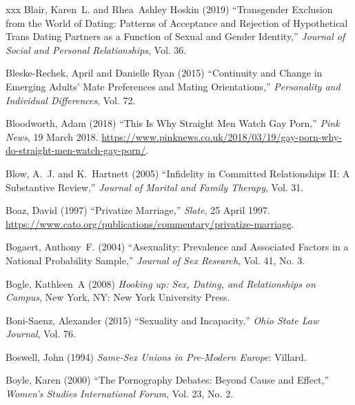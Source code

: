 \documentclass[]{jlreq} \usepackage{mystyle}
\begin{document}
\begin{thebibliography}{xxx}
Blair, Karen~L. and Rhea~Ashley Hoskin (2019) ``Transgender Exclusion from the
  World of Dating: Patterns of Acceptance and Rejection of Hypothetical Trans
  Dating Partners as a Function of Sexual and Gender Identity,'' \textit{
  Journal of Social and Personal Relationships}, Vol. 36.

Bleske-Rechek, April and Danielle Ryan (2015) ``Continuity and Change in
  Emerging Adults' Mate Preferences and Mating Orientations,'' \textit{
  Personality and Individual Differences}, Vol. 72.

Bloodworth, Adam (2018) ``This Is Why Straight Men Watch Gay Porn,'' \emph{Pink
  News}, 19 March 2018.
  \url{https://www.pinknews.co.uk/2018/03/19/gay-porn-why-do-straight-men-watch-gay-porn/}.

Blow, A.~J. and K.~Hartnett (2005) ``Infidelity in Committed Relationships II:
  A Substantive Review,'' \textit{ Journal of Marital and Family Therapy}, Vol.
  31.

Boaz, David (1997) ``Privatize Marriage,'' \emph{Slate}, 25 April 1997.
  \url{https://www.cato.org/publications/commentary/privatize-marriage}.

Bogaert, Anthony~F. (2004) ``Asexuality: Prevalence and Associated Factors in a
  National Probability Sample,'' \textit{ Journal of Sex Research}, Vol. 41,
  No. 3.

Bogle, Kathleen~A (2008)  \textit{ Hooking up: Sex, Dating, and Relationships
  on Campus}, New York, NY: New York University Press.

Boni-Saenz, Alexander (2015) ``Sexuality and Incapacity,'' \textit{ Ohio State
  Law Journal}, Vol. 76.

Boswell, John (1994)  \textit{ Same-Sex Unions in Pre-Modern Europe}: Villard.

Boyle, Karen (2000) ``The Pornography Debates: Beyond Cause and Effect,''
  \textit{ Women's Studies International Forum}, Vol. 23, No. 2.


\end{thebibliography}
\end{document}
